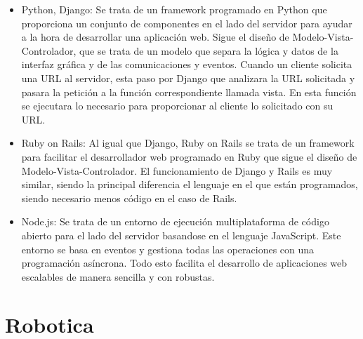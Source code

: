\begin{itemize}
	\item Python, Django: Se trata de un framework programado en Python que proporciona un conjunto de componentes en el lado del servidor para ayudar a la hora de desarrollar una aplicación web. Sigue el diseño de Modelo-Vista-Controlador, que se trata de un modelo que separa la lógica y datos de la interfaz gráfica y de las comunicaciones y eventos. Cuando un cliente solicita una URL al servidor, esta paso por Django que analizara la URL solicitada y pasara la petición a la función correspondiente llamada vista. En esta función se ejecutara lo necesario para proporcionar al cliente lo solicitado con su URL.
	\item Ruby on Rails: Al igual que Django, Ruby on Rails se trata de un framework para facilitar el desarrollador web programado en Ruby que sigue el diseño de Modelo-Vista-Controlador. El funcionamiento de Django y Rails es muy similar, siendo la principal diferencia el lenguaje en el que están programados, siendo necesario menos código en el caso de Rails.
	\item Node.js: Se trata de un entorno de ejecución multiplataforma de código abierto para el lado del servidor basandose en el lenguaje JavaScript. Este entorno se basa en eventos y gestiona todas las operaciones con una programación asíncrona. Todo esto facilita el desarrollo de aplicaciones web escalables de manera sencilla y con robustas.
\end{itemize}

\section{Robotica}
